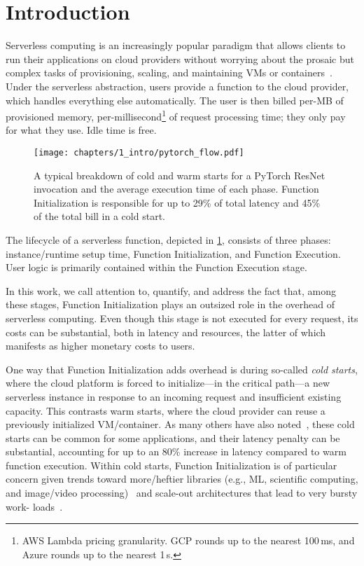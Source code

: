 \documentclass[sigplan,screen]{acmart}
\begin{document}
\maketitle


\section{Introduction}
\label{sec:intro}


Serverless computing is an increasingly popular paradigm that allows clients to run their applications on cloud providers without worrying about the prosaic but complex tasks of provisioning, scaling, and maintaining VMs or containers~\cite{Jonas:EECS-2019-3}.
Under the serverless abstraction, users provide a function to the cloud provider, which handles everything else automatically.
The user is then billed per-MB of provisioned memory, per-millisecond\footnote{AWS Lambda pricing granularity. GCP rounds up to the nearest 100\,ms, and Azure rounds up to the nearest 1\,s.} of request processing time;
they only pay for what they use.
Idle time is free.

\begin{figure}[t]
\centering
\vspace{1em}
\texttt{[image: chapters/1\_intro/pytorch\_flow.pdf]}
\caption{A typical breakdown of cold and warm starts for a PyTorch ResNet invocation and the average execution time of each phase.
Function Initialization is responsible for up to 29\% of total latency and 45\% of the total bill in a cold start.}
\label{fig:pytorch-flow}
\end{figure}

The lifecycle of a serverless function, depicted in \cref{fig:pytorch-flow}, consists of three phases: instance/runtime setup time, Function Initialization, and Function Execution.
User logic is primarily contained within the Function Execution stage.

In this work, we call attention to, quantify, and address the fact that, among these stages, Function Initialization plays an outsized role in the overhead of serverless computing.
Even though this stage is not executed for every request, its costs can be substantial, both in latency and resources, the latter of which manifests as higher monetary costs to users.

One way that Function Initialization adds overhead is during so-called \textit{cold starts},
where the cloud platform is forced to initialize---in the critical path---a new serverless instance in response to an incoming request and insufficient existing capacity.
This contrasts warm starts, where the cloud provider can reuse a previously initialized VM/container.
As many others have also noted~\cite{wild2020,faascache2021,faaslight2023}, these cold starts can be common for some applications, and their latency penalty can be substantial, accounting for up to an 80\% increase in latency compared to warm function execution. Within cold starts, Function Initialization is of particular concern given trends toward more/heftier libraries (e.g.,
ML, scientific computing, and image/video processing)~\cite{pypistats}
and scale-out architectures that lead to very bursty work-
loads~\cite{fouladi19gg}.
\end{document}
